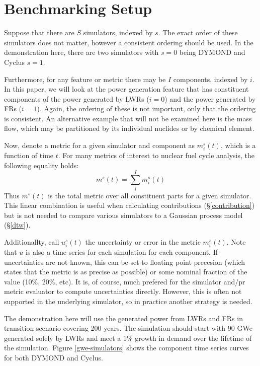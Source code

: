 \section{Benchmarking Setup}
\label{setup}

Suppose that there are $S$ simulators, indexed by $s$. The exact order 
of these simulators does not matter, however a consistent ordering should
be used. In the demonstration here, there are two simulators with $s=0$
being DYMOND and Cyclus $s=1$.

Furthermore, for any feature or metric there may be $I$ components, 
indexed by $i$. In this paper, we will look at the power generation feature
that has constituent components of the power generated by LWRs ($i=0$) and
the power generated by FRs ($i=1$).  Again, the ordering of these is not 
important, only that the ordering is consistent. An alternative example
that will not be examined here is the mass flow, which may be partitioned 
by its individual nuclides or by chemical element.

Now, denote a metric for a given simulator and component as 
$m_i^s(t)$, which is a function of time $t$. For many metrics of interest 
to nuclear fuel cycle analysis, the following equality holds:
\begin{equation}
m^s(t) = \sum_i^I m_i^s(t)
\end{equation}
Thus $m^s(t)$ is the total metric over all constituent parts for a given 
simulator. This linear combination is useful when calculating contributions
(\S \ref{contribution}) but is not needed to compare various simulators
to a Gaussian process model (\S \ref{dtw}).

Additionallty, call $u_i^s(t)$ the uncertainty or error in the metric 
$m_i^s(t)$. Note that $u$ is also a time series for each simulation for 
each component. If uncertainties are not known, this can be set to floating
point precesion (which states that the metric is as precise as possible) or
some nominal fraction of the value (10\%, 20\%, etc). It is, of course, 
much prefered for the simulator and/pr metric evaluator to compute 
uncertainties directly. However, this is often not supported in the underlying
simulator, so in practice another strategy is needed.  

The demonstration here will use the generated power from LWRs and FRs in 
transition scenario covering 200 years. The simulation should start with
90 GWe generated solely by LWRs and meet a 1\% growth in demand over the 
lifetime of the simulation. Figure \ref{gwe-simulators} shows the component time 
series curves for both DYMOND and Cyclus.

